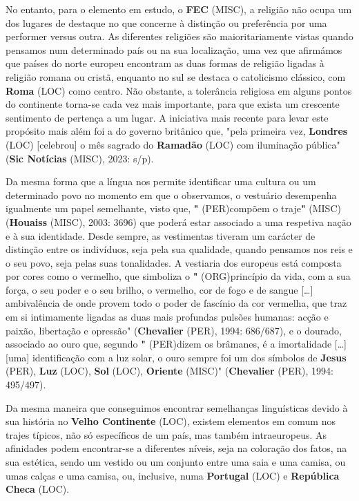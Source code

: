 \documentclass[12pt,a4paper]{article}
\begin{document}
No  entanto,  para  o  elemento  em  estudo,  o  \textbf{FEC} (MISC),  a  religião  não  ocupa  um  dos lugares de destaque no que concerne à distinção ou preferência por uma performer versus outra.  As  diferentes  religiões  são  maioritariamente  vistas  quando  pensamos  num determinado  país  ou  na  sua  localização,  uma  vez  que  afirmámos  que  países  do  norte europeu  encontram  as  duas  formas  de  religião  ligadas  à  religião  romana  ou  cristã, enquanto no sul se destaca o catolicismo clássico, com \textbf{Roma} (LOC) como centro. Não obstante, a tolerância religiosa em alguns pontos do continente torna-se cada vez mais importante, para que exista um crescente sentimento de pertença a um lugar. A iniciativa mais recente para levar este propósito mais além foi a do governo britânico que, "pela primeira vez, \textbf{Londres} (LOC) [celebrou] o mês sagrado do \textbf{Ramadão} (LOC) com iluminação pública" (\textbf{Sic Notícias} (MISC), 2023: s/p).

Da  mesma  forma  que  a  língua  nos  permite  identificar  uma  cultura  ou  um determinado  povo  no  momento  em  que  o  observamos,  o  vestuário  desempenha igualmente um papel semelhante, visto que, \textbf{"} (PER)compõem o traje\textbf{"} (MISC) (\textbf{Houaiss} (MISC), 2003: 3696) que poderá estar associado a uma respetiva nação e à sua identidade. Desde sempre, as vestimentas tiveram um carácter de distinção entre os indivíduos, seja pela sua qualidade, quando  pensamos  nos  reis  e  o  seu  povo,  seja  pelas  suas  tonalidades.  A  vestiaria  dos europeus está composta por cores como o vermelho, que simboliza o \textbf{"} (ORG)princípio da vida, com a sua força, o seu poder e o seu brilho, o vermelho, cor de fogo e de sangue […] ambivalência de onde provem todo o poder de fascínio da cor vermelha, que traz em si intimamente ligadas as duas mais profundas pulsões humanas: acção e paixão, libertação e  opressão"  (\textbf{Chevalier} (PER),  1994:  686/687),  e  o  dourado,  associado  ao  ouro  que,  segundo \textbf{"} (PER)dizem os brâmanes, é a imortalidade […] [uma] identificação com a luz solar, o ouro sempre foi um dos símbolos de \textbf{Jesus} (PER), \textbf{Luz} (LOC), \textbf{Sol} (LOC), \textbf{Oriente} (MISC)" (\textbf{Chevalier} (PER), 1994: 495/497).

Da mesma maneira que conseguimos encontrar semelhanças linguísticas devido à sua história no \textbf{Velho Continente} (LOC), existem elementos em comum nos trajes típicos, não só específicos de um país, mas também intraeuropeus. As afinidades podem encontrar-se a diferentes níveis, seja na coloração dos fatos, na sua estética, sendo um vestido ou um conjunto entre uma saia e uma camisa, ou umas calças e uma camisa, ou, inclusive, numa \textbf{Portugal} (LOC) e \textbf{República Checa} (LOC).
\end{document}
